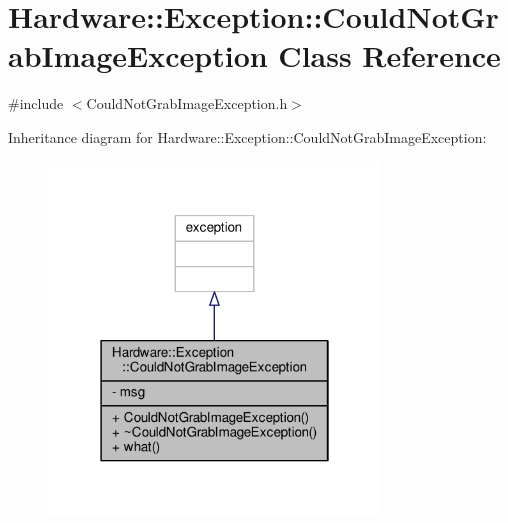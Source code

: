 \hypertarget{class_hardware_1_1_exception_1_1_could_not_grab_image_exception}{}\section{Hardware\+:\+:Exception\+:\+:Could\+Not\+Grab\+Image\+Exception Class Reference}
\label{class_hardware_1_1_exception_1_1_could_not_grab_image_exception}


{\ttfamily \#include $<$Could\+Not\+Grab\+Image\+Exception.\+h$>$}



Inheritance diagram for Hardware\+:\+:Exception\+:\+:Could\+Not\+Grab\+Image\+Exception\+:\nopagebreak
\begin{figure}[H]
\begin{center}
\leavevmode
\includegraphics[width=250pt]{class_hardware_1_1_exception_1_1_could_not_grab_image_exception__inherit__graph}
\end{center}
\end{figure}


